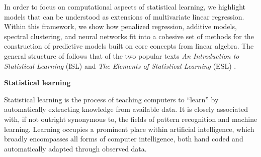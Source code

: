 \documentclass[12pt,hidelinks]{article}
\numberwithin{equation}{section}
\begin{document}
In order to focus on computational aspects of statistical learning,
we highlight models that can be understood as extensions
of multivariate linear regression. Within this framework, we show
how penalized regression, additive models, spectral clustering,
and neural networks fit into a cohesive set of methods for
the construction of predictive models built on core concepts from
linear algebra. The general structure
of follows that of the two popular texts \textit{An Introduction
to Statistical Learning} (ISL) \cite{james2013introduction} and
\textit{The Elements of Statistical Learning} (ESL)
\cite{friedman2001elements}.

\vspace{12pt}
\textbf{Statistical learning}

Statistical learning is the process of teaching computers to ``learn'' by
automatically extracting knowledge from available data. It is closely
associated with, if not outright synonymous to, the fields of pattern
recognition and machine learning. Learning occupies a prominent place within
artificial intelligence, which broadly encompasses all forms of computer
intelligence, both hand coded and automatically adapted through observed data.
\end{document}
